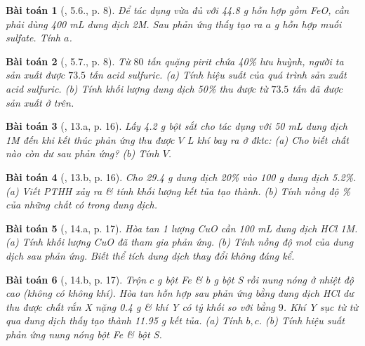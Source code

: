 \documentclass{article}
\newtheorem{baitoan}{Bài toán}
\begin{document}
\begin{baitoan}[\cite{SBT_Hoa_Hoc_9}, 5.6., p. 8]
	Để tác dụng vừa đủ với \emph{44.8 g} hỗn hợp gồm \emph{FeO, } cần phải dùng \emph{400 mL} dung dịch \emph{ 2M}. Sau phản ứng thấy tạo ra $a$ \emph{g} hỗn hợp muối sulfate. Tính $a$.
\end{baitoan}

\begin{baitoan}[\cite{SBT_Hoa_Hoc_9}, 5.7., p. 8]
	Từ $80$ tấn quặng pirit chứa \emph{40\%} lưu huỳnh, người ta sản xuất được $73.5$ tấn acid sulfuric. (a) Tính hiệu suất của quá trình sản xuất acid sulfuric. (b) Tính khối lượng dung dịch \emph{ 50\%} thu được từ $73.5$ tấn \emph{} đã được sản xuất ở trên.
\end{baitoan}

\begin{baitoan}[\cite{An_350_BT_Hoa_Hoc_9}, 13.a, p. 16]
	Lấy \emph{4.2 g} bột sắt cho tác dụng với \emph{50 mL} dung dịch \emph{ 1M} đến khi kết thúc phản ứng thu được $V$ \emph{L} khí \emph{} bay ra ở đktc: (a) Cho biết chất nào còn dư sau phản ứng? (b) Tính $V$.
\end{baitoan}

\begin{baitoan}[\cite{An_350_BT_Hoa_Hoc_9}, 13.b, p. 16]
	Cho \emph{29.4 g} dung dịch \emph{ 20\%} vào \emph{100 g} dung dịch \emph{ 5.2\%}. (a) Viết PTHH xảy ra \& tính khối lượng kết tủa tạo thành. (b) Tính nồng độ \% của những chất có trong dung dịch.
\end{baitoan}

\begin{baitoan}[\cite{An_350_BT_Hoa_Hoc_9}, 14.a, p. 17]
	Hòa tan 1 lượng \emph{CuO} cần \emph{100 mL} dung dịch \emph{HCl 1M}. (a) Tính khối lượng \emph{CuO} đã tham gia phản ứng. (b) Tính nồng độ mol của dung dịch sau phản ứng. Biết thể tích dung dịch thay đổi không đáng kể.
\end{baitoan}

\begin{baitoan}[\cite{An_350_BT_Hoa_Hoc_9}, 14.b, p. 17]
	Trộn $c$ \emph{g} bột \emph{Fe} \& $b$ \emph{g} bột \emph{S} rồi nung nóng ở nhiệt độ cao (không có không khí). Hòa tan hỗn hợp sau phản ứng bằng dung dịch \emph{HCl} dư thu được chất rắn X nặng \emph{0.4 g} \& khí Y có tỷ khối so với \emph{} bằng $9$. Khí Y sục từ từ qua dung dịch \emph{} thấy tạo thành \emph{11.95 g} kết tủa. (a) Tính $b,c$. (b) Tính hiệu suất phản ứng nung nóng bột \emph{Fe} \& bột \emph{S}.
\end{baitoan}
\end{document}
